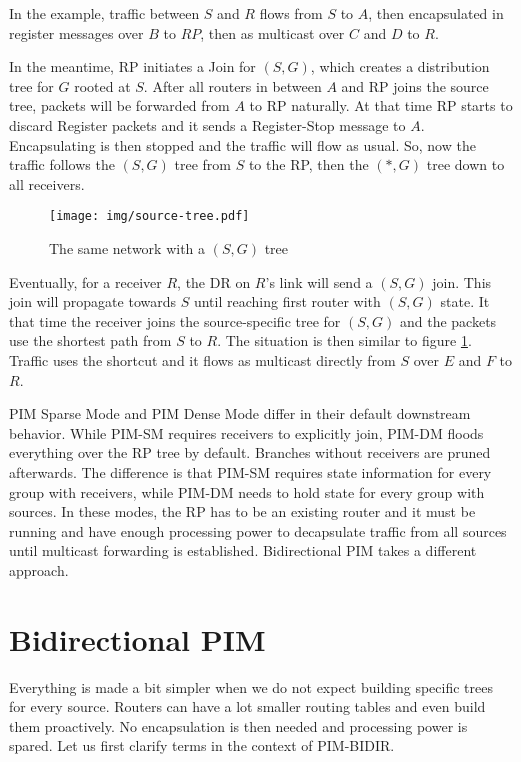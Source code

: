 In the example, traffic between $S$ and $R$ flows from $S$ to $A$, then
encapsulated in register messages over $B$ to $RP$, then as multicast over $C$
and $D$ to $R$.

In the meantime, RP initiates a Join for $(S, G)$, which creates a distribution
tree for $G$ rooted at $S$. After all routers in between $A$ and RP joins the
source tree, packets will be forwarded from $A$ to RP naturally. At that time
RP starts to discard Register packets and it sends a Register-Stop message to
$A$. Encapsulating is then stopped and the traffic will flow as usual. So, now
the traffic follows the $(S,G)$ tree from $S$ to the RP, then the $(*,G)$ tree
down to all receivers.

\begin{figure}[htp]
\centering
\texttt{[image: img/source-tree.pdf]}
\caption{The same network with a $(S,G)$ tree}
\label{sg-tree}
\end{figure}

Eventually, for a receiver $R$, the DR on $R$'s link will send a $(S, G)$ join.
This join will propagate towards $S$ until reaching first router with $(S,G)$
state. It that time the receiver joins the source-specific tree for $(S,G)$ and
the packets use the shortest path from $S$ to $R$. The situation is then similar to
figure \ref{sg-tree}. Traffic uses the shortcut and it flows as multicast
directly from $S$ over $E$ and $F$ to $R$.

PIM Sparse Mode and PIM Dense Mode differ in their default downstream behavior.
While PIM-SM requires receivers to explicitly join, PIM-DM floods everything
over the RP tree by default. Branches without receivers are pruned afterwards.
The difference is that PIM-SM requires state information for every group with
receivers, while PIM-DM needs to hold state for every group with sources.
In these modes, the RP has to be an existing router and it must be running and have
enough processing power to decapsulate traffic from all sources until multicast
forwarding is established. Bidirectional PIM takes a different approach.

\section{Bidirectional PIM}

Everything is made a bit simpler when we do not expect building specific trees
for every source. Routers can have a lot smaller routing tables and even build
them proactively. No encapsulation is then needed and processing power is
spared. Let us first clarify terms in the context of PIM-BIDIR.

